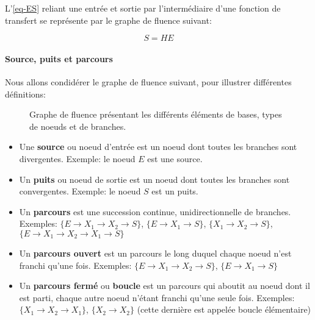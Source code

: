 L'\cref{eq-ES} reliant une entrée et sortie par l'intermédiaire d'une fonction 
de transfert se représente par le graphe de fluence suivant:
\begin{center}
    
    \[
        S=HE
    \]
\end{center}
\paragraph{Source, puits et parcours}
Nous allons condidérer le graphe de fluence suivant, pour illustrer 
différentes définitions: 
\begin{figure}[!h]
    \centering
    
    \caption{Graphe de fluence présentant les différents éléments de bases, 
    types de noeuds et de branches.}
\end{figure}
\begin{itemize}
    \item Une \textbf{source} ou noeud d'entrée est un noeud 
          dont toutes les branches sont divergentes. Exemple: le noeud 
          $E$ est une source.
    \item Un \textbf{puits} ou noeud de sortie est un noeud dont toutes 
    les branches sont convergentes. Exemple: le noeud $S$ est un puits.
    \item Un \textbf{parcours} est une succession continue, 
    unidirectionnelle de branches. Exemples: 
    $\{E\rightarrow X_1\rightarrow X_2\rightarrow S\}$, 
    $\{E\rightarrow X_1\rightarrow S\}$, 
    $\{X_1\rightarrow X_2\rightarrow S\}$, 
    $\{E\rightarrow X_1\rightarrow X_2\rightarrow X_1\rightarrow S\}$

    \item Un \textbf{parcours ouvert} est un parcours le long duquel chaque 
          noeud n'est franchi qu'une fois. Exemples: 
          $\{E\rightarrow X_1\rightarrow X_2\rightarrow S\}$, 
          $\{E\rightarrow X_1 \rightarrow S\}$
    \item Un \textbf{parcours fermé} ou \textbf{boucle} est un parcours qui 
          aboutit au noeud dont il est parti, chaque autre noeud n'étant 
          franchi qu'une seule fois. Exemples: 
          $\{X_1\rightarrow X_2\rightarrow X_1\}$, 
          $\{X_2\rightarrow X_2\}$ (cette dernière est appelée boucle 
          élémentaire)
\end{itemize}
